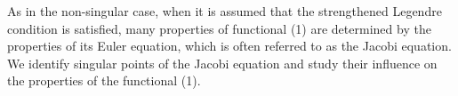 \documentclass[12pt]{llncs}
\begin{document}
As in the non-singular case, when it is assumed that the strengthened Legendre condition is satisfied, many properties of functional (1) are determined by the properties of its Euler equation, which is often referred to as the Jacobi equation. We identify singular points of the Jacobi equation and study their influence on the properties of the functional (1).


\end{document}
